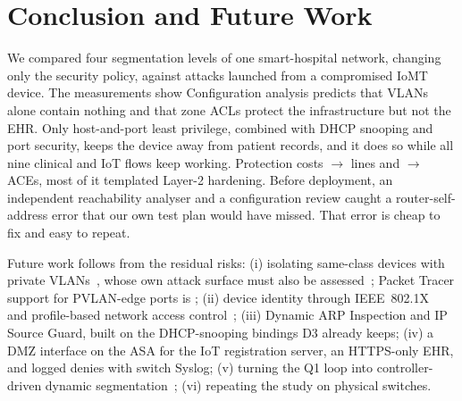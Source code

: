 \section{Conclusion and Future Work}
\label{sec:conclusion}
We compared four segmentation levels of one smart-hospital network, changing only the security policy, against attacks launched from a compromised IoMT device. \ifmeasured The measurements show \else Configuration analysis predicts\expnote{} \fi that VLANs alone contain nothing and that zone ACLs protect the infrastructure but not the EHR. Only host-and-port least privilege, combined with DHCP snooping and port security, keeps the device away from patient records, and it does so while all nine clinical and IoT flows keep working. Protection costs \cfgLinesDzero{}$\rightarrow$\cfgLinesDthree{} lines and \acesDzero{}$\rightarrow$\acesDthree{} ACEs, most of it templated Layer-2 hardening. Before deployment, an independent reachability analyser and a configuration review caught a router-self-address error that our own test plan would have missed. That error is cheap to fix and easy to repeat.

Future work follows from the residual risks:
(i) isolating same-class devices with private VLANs~\cite{rfc5517}, whose own attack surface must also be assessed~\cite{Alvarez2023PerformanceAnalysis}; Packet Tracer support for PVLAN-edge ports is \probeProtected{};
(ii) device identity through IEEE~802.1X~\cite{ieee8021x} and profile-based network access control~\cite{Garciateodoro2022NovelZero,Allouzi2024EnablingZero};
(iii) Dynamic ARP Inspection and IP Source Guard, built on the DHCP-snooping bindings D3 already keeps;
(iv) a DMZ interface on the ASA for the IoT registration server, an HTTPS-only EHR, and logged denies with switch Syslog;
(v) turning the Q1 loop into controller-driven dynamic segmentation~\cite{Raval2026ImplementationDynamic,Grammatikis2021ModelingDetecting};
(vi) repeating the study on physical switches.
